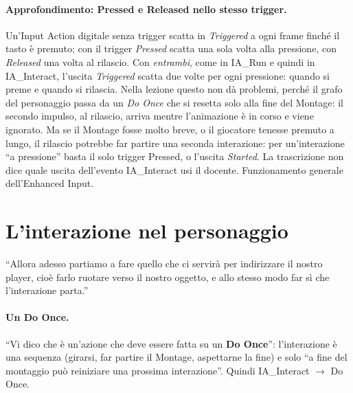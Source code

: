 \paragraph{Approfondimento: Pressed e Released nello stesso trigger.} Un'Input Action
digitale senza trigger scatta in \emph{Triggered} a ogni frame finché il tasto è premuto; con
il trigger \emph{Pressed} scatta una sola volta alla pressione, con \emph{Released} una
volta al rilascio. Con \emph{entrambi}, come in IA\_Run e quindi in IA\_Interact, l'uscita
\emph{Triggered} scatta due volte per ogni pressione: quando si preme e quando si rilascia.
Nella lezione questo non dà problemi, perché il grafo del personaggio passa da un \emph{Do
Once} che si resetta solo alla fine del Montage: il secondo impulso, al rilascio, arriva
mentre l'animazione è in corso e viene ignorato. Ma se il Montage fosse molto breve, o il
giocatore tenesse premuto a lungo, il rilascio potrebbe far partire una seconda
interazione: per un'interazione ``a pressione'' basta il solo trigger Pressed, o l'uscita
\emph{Started}. La trascrizione non dice quale uscita dell'evento IA\_Interact usi il docente.
Funzionamento generale dell'Enhanced Input.

\section{L'interazione nel personaggio}
\label{ue12:sec:player}

``Allora adesso partiamo a fare quello che ci servirà per indirizzare il nostro player,
cioè farlo ruotare verso il nostro oggetto, e allo stesso modo far sì che l'interazione
parta.''

\paragraph{Un Do Once.} ``Vi dico che è un'azione che deve essere fatta su un \textbf{Do
Once}'': l'interazione è una sequenza (girarsi, far partire il Montage, aspettarne la fine)
e solo ``a fine del montaggio può reiniziare una prossima interazione''. Quindi IA\_Interact
$\rightarrow$ Do Once.

